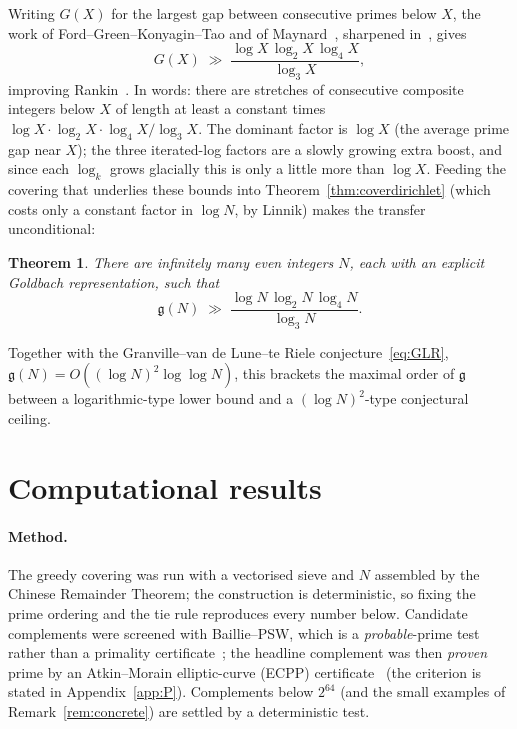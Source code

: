\documentclass[11pt]{article}
\theoremstyle{plain}
\newtheorem{theorem}{Theorem}
\theoremstyle{definition}
\theoremstyle{remark}
\newcommand{\N}{N}
\newcommand{\g}{\mathfrak{g}}
\begin{document}
Writing $G(X)$ for the largest gap between consecutive primes below $X$, the work
of Ford--Green--Konyagin--Tao and of Maynard~\cite{FGKT,Maynard}, sharpened
in~\cite{FGKMT}, gives
\[
G(X)\;\gg\;\frac{\log X\,\log_2 X\,\log_4 X}{\log_3 X},
\]
improving Rankin~\cite{Rankin}. In words: there are stretches of consecutive
composite integers below $X$ of length at least a constant times
$\log X\cdot\log_2 X\cdot\log_4 X/\log_3 X$. The dominant factor is $\log X$ (the
average prime gap near $X$); the three iterated-log factors are a slowly growing
extra boost, and since each $\log_k$ grows glacially this is only a little more
than $\log X$. Feeding the covering that underlies these bounds into
Theorem~\ref{thm:coverdirichlet} (which costs only a constant factor in
$\log\N$, by Linnik) makes the transfer unconditional:

\begin{theorem}\label{thm:lower}
There are infinitely many even integers $\N$, each with an explicit Goldbach
representation, such that
\[
\g(\N)\;\gg\;\frac{\log \N\,\log_2 \N\,\log_4 \N}{\log_3 \N}.
\]
\end{theorem}

Together with the Granville--van de Lune--te Riele
conjecture~\eqref{eq:GLR}, $\g(\N)=O((\log \N)^2\log\log \N)$, this brackets the
maximal order of $\g$ between a logarithmic-type lower bound and a
$(\log \N)^2$-type conjectural ceiling.

\section{Computational results}\label{sec:results}

\paragraph{Method.} The greedy covering was run with a vectorised sieve and $\N$
assembled by the Chinese Remainder Theorem; the construction is deterministic, so
fixing the prime ordering and the tie rule reproduces every number below.
Candidate complements were screened with Baillie--PSW, which is a
\emph{probable}-prime test rather than a primality certificate~\cite{PSW}; the
headline complement was then \emph{proven} prime by an Atkin--Morain
elliptic-curve (ECPP) certificate~\cite{AtkinMorain} (the criterion is stated in
Appendix~\ref{app:P}). Complements below $2^{64}$ (and the small examples of
Remark~\ref{rem:concrete}) are settled by a deterministic test.
\end{document}
